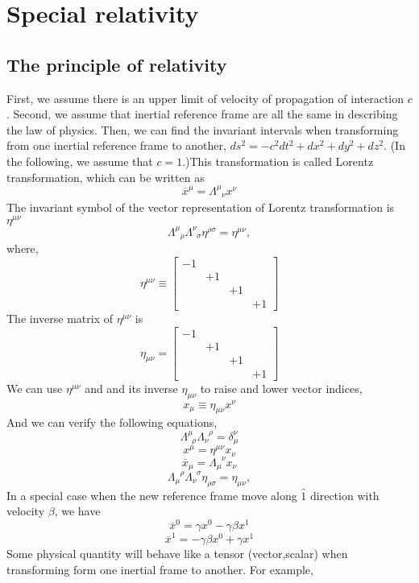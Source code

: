 \documentclass[cyan]{elegantnote}
\author{Yuyang Songsheng}
\begin{document}
\maketitle
\tableofcontents
\chapter{Special relativity}
\section{The principle of relativity}
First, we assume there is an upper limit of velocity of propagation of interaction $c$. Second, we assume that inertial reference frame are all the same in describing the law of physics. Then, we can find the invariant intervals when transforming from one inertial reference frame to another, $ds^2 = -c^2 dt^2 + dx^2 + dy^2 + dz^2$. 
(In the following, we assume that $c=1$.)This transformation is called Lorentz transformation, which can be written as
\[\overline{x}^{\mu} = \Lambda^{\mu}_{\phantom{\mu}\nu} x^{\nu}\]
The invariant symbol of the vector representation of Lorentz transformation is $\eta^{\mu \nu}$
\[\Lambda^{\mu}_{\phantom{\mu}\rho}  \Lambda^{\nu}_{\phantom{\nu}\sigma}  \eta^{\rho \sigma} = \eta^{\mu \nu},\]
where,
\[\eta^{\mu \nu} \equiv \left[ 
\begin{matrix} 
-1& & & \\ 
& +1 & & \\
& & +1 & \\
& & & +1
\end{matrix} 
\right]\]
The inverse matrix of $\eta^{\mu \nu}$ is
\[\eta_{\mu \nu} = \left[ 
\begin{matrix} 
-1& & & \\ 
& +1 & & \\
& & +1 & \\
& & & +1
\end{matrix} 
\right]\]
We can use $\eta^{\mu \nu}$ and and its inverse $\eta_{\mu \nu}$ to raise and lower vector indices, 
\[x_{\mu} \equiv \eta_{\mu \nu} x^{\nu}\]
And we can verify the following equations,
\[\Lambda^{\mu}_{\phantom{\rho}\rho} \Lambda_{\nu}^{\phantom{\rho}\rho} = \delta^{\nu}_{\mu} \]
\[x^{\mu} = \eta^{\mu \nu} x_{\nu}\]
\[\overline{x}_{\mu} = \Lambda_{\mu}^{\phantom{\mu}\nu} x_{\nu}\]
\[\Lambda_{\mu}^{\phantom{\mu}\rho}  \Lambda_{\nu}^{\phantom{\nu}\sigma}  \eta_{\rho \sigma} = \eta_{\mu \nu},\]
In a special case when the new reference frame move along $\hat{1}$ direction with velocity $\beta$, we have
\[\overline{x}^{0} = \gamma x^0 - \gamma \beta x^1\]
\[\overline{x}^{1} = -\gamma \beta x^0 + \gamma x^1\]
Some physical quantity will behave like a tensor (vector,scalar) when transforming form one inertial frame to another. For example,
\end{document}
